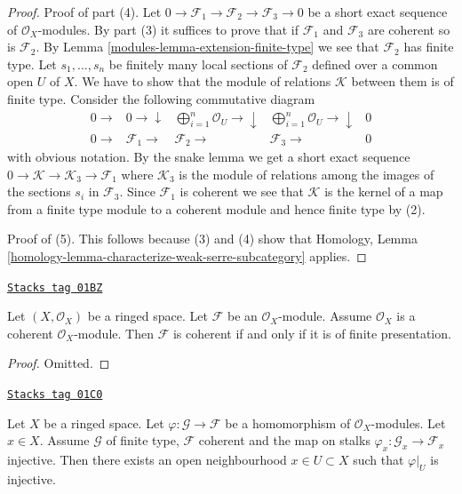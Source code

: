 \begin{proof}
\medskip\noindent
Proof of part (4).
Let $0 \to \mathcal{F}_1 \to \mathcal{F}_2 \to \mathcal{F}_3 \to 0$
be a short exact sequence of $\mathcal{O}_X$-modules. By part
(3) it suffices
to prove that if $\mathcal{F}_1$ and $\mathcal{F}_3$ are coherent
so is $\mathcal{F}_2$. By Lemma \ref{modules-lemma-extension-finite-type} we
see that $\mathcal{F}_2$ has finite type. Let
$s_1, \ldots, s_n$ be finitely many local
sections of $\mathcal{F}_2$ defined over a common open $U$ of $X$.
We have to show that the module of relations $\mathcal{K}$
between them is of finite type.
Consider the following commutative diagram
$$
\begin{array}{ccccc}0 \longrightarrow & 0 \longrightarrow\downarrow & \bigoplus_{i = 1}^{n} \mathcal{O}_U \longrightarrow\downarrow & \bigoplus_{i = 1}^{n} \mathcal{O}_U \longrightarrow\downarrow & 0 \\ 0 \longrightarrow & \mathcal{F}_1 \longrightarrow & \mathcal{F}_2 \longrightarrow & \mathcal{F}_3 \longrightarrow & 0\end{array}
$$
with obvious notation. By the snake lemma
we get a short exact sequence
$0 \to \mathcal{K} \to \mathcal{K}_3 \to \mathcal{F}_1$
where $\mathcal{K}_3$ is the module of relations among
the images of the sections $s_i$ in $\mathcal{F}_3$.
Since $\mathcal{F}_1$ is coherent we see that
$\mathcal{K}$ is the kernel of a map from a finite type module
to a coherent module and hence finite type by (2).

\medskip\noindent
Proof of (5). This follows because (3) and (4) show that
Homology, Lemma \ref{homology-lemma-characterize-weak-serre-subcategory}
applies.
\end{proof}

\begin{lemma}
\label{modules-lemma-coherent-structure-sheaf}
\href{https://stacks.math.columbia.edu/tag/01BZ}{\texttt{Stacks tag 01BZ}}

Let $(X, \mathcal{O}_X)$ be a ringed space.
Let $\mathcal{F}$ be an $\mathcal{O}_X$-module.
Assume $\mathcal{O}_X$ is a coherent $\mathcal{O}_X$-module.
Then $\mathcal{F}$ is coherent if and only if it is
of finite presentation.
\end{lemma}

\begin{proof}
Omitted.
\end{proof}

\begin{lemma}
\label{modules-lemma-finite-type-to-coherent-injective-on-stalk}
\href{https://stacks.math.columbia.edu/tag/01C0}{\texttt{Stacks tag 01C0}}

Let $X$ be a ringed space.
Let $\varphi : \mathcal{G} \to \mathcal{F}$ be a homomorphism
of $\mathcal{O}_X$-modules.
Let $x \in X$. Assume $\mathcal{G}$ of finite type,
$\mathcal{F}$ coherent and the map on stalks
$\varphi_x : \mathcal{G}_x \to \mathcal{F}_x$ injective.
Then there exists an open neighbourhood
$x \in U \subset X$ such that $\varphi|_U$ is injective.
\end{lemma}

